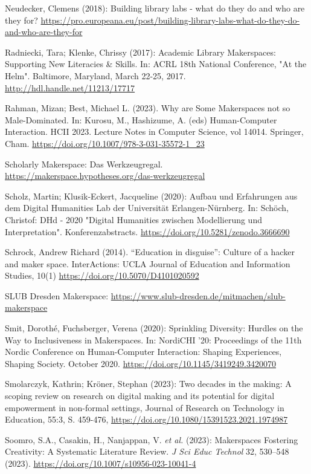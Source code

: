 \documentclass[a4paper,
fontsize=11pt,
oneside,
numbers=noperiodatend,
parskip=half-,
bibliography=totoc,
final
]{scrartcl}
\begin{document}
Neudecker, Clemens (2018): Building library labs - what do they do and
who are they for?
\url{https://pro.europeana.eu/post/building-library-labs-what-do-they-do-and-who-are-they-for}

Radniecki, Tara; Klenke, Chrissy (2017): Academic Library Makerspaces:
Supporting New Literacies \& Skills. In: ACRL 18th National Conference,
"At the Helm". Baltimore, Maryland, March 22-25, 2017.
\url{http://hdl.handle.net/11213/17717}

Rahman, Mizan; Best, Michael L. (2023). Why are Some Makerspaces not so
Male-Dominated. In: Kurosu, M., Hashizume, A. (eds) Human-Computer
Interaction. HCII 2023. Lecture Notes in Computer Science, vol 14014.
Springer, Cham. \url{https://doi.org/10.1007/978-3-031-35572-1_23}

Scholarly Makerspace: Das Werkzeugregal.
\url{https://makerspace.hypotheses.org/das-werkzeugregal}

Scholz, Martin; Klusik-Eckert, Jacqueline (2020): Aufbau und Erfahrungen
aus dem Digital Humanities Lab der Universität Erlangen-Nürnberg. In:
Schöch, Christof: DHd - 2020 "Digital Humanities zwischen Modellierung
und Interpretation". Konferenzabstracts.
\url{https://doi.org/10.5281/zenodo.3666690}

Schrock, Andrew Richard (2014). \enquote{Education in disguise}: Culture
of a hacker and maker space. InterActions: UCLA Journal of Education and
Information Studies, 10(1) \url{https://doi.org/10.5070/D4101020592}

SLUB Dresden Makerspace:
\url{https://www.slub-dresden.de/mitmachen/slub-makerspace}

Smit, Dorothé, Fuchsberger, Verena (2020): Sprinkling Diversity: Hurdles
on the Way to Inclusiveness in Makerspaces. In: NordiCHI '20:
Proceedings of the 11th Nordic Conference on Human-Computer Interaction:
Shaping Experiences, Shaping Society. October 2020.
\url{https://doi.org/10.1145/3419249.3420070}

Smolarczyk, Kathrin; Kröner, Stephan (2023): Two decades in the making:
A scoping review on research on digital making and its potential for
digital empowerment in non-formal settings, Journal of Research on
Technology in Education, 55:3, S. 459-476,
\url{https://doi.org/10.1080/15391523.2021.1974987}

Soomro, S.A., Casakin, H., Nanjappan, V. \emph{et al.} (2023):
Makerspaces Fostering Creativity: A Systematic Literature Review.
\emph{J Sci Educ Technol} 32, 530--548 (2023).
\url{https://doi.org/10.1007/s10956-023-10041-4}
\end{document}
